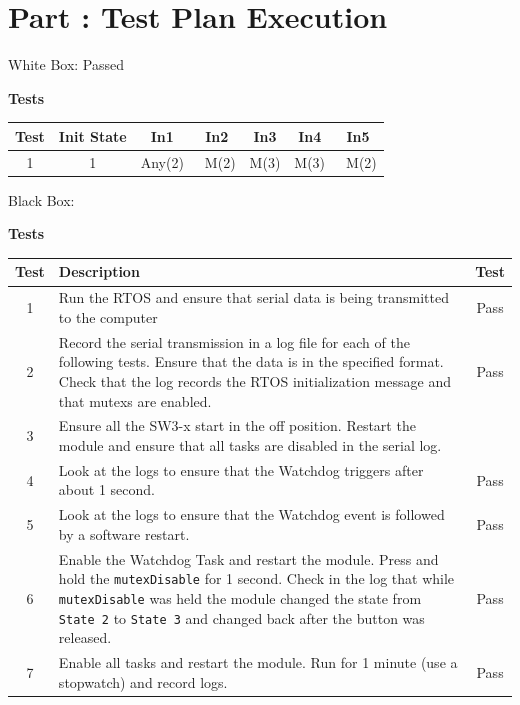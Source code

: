 \documentclass{article}
\newcounter{partNum}
\newcommand{\partNum}{%
        \stepcounter{partNum}%
        \thepartNum}
\newcommand{\sectPart}[1]{\section*{Part \partNum: #1}}
\begin{document}
\sectPart{Test Plan Execution}

White Box: Passed

\begin{center}
    \textbf{Tests}\\
    \vspace{0.5em}
    \begin{tabular}{| c | c | c | c | c | c | c |}
        \hline
        Test & Init State & In1 & In2 & In3 & In4 & In5 \\ \hline
        1 & 1 & Any(2) & ~M(2) & M(3) & M(3) & ~M(2) \\ \hline
    \end{tabular}
\end{center}

Black Box: 

\begin{center}
    \textbf{Tests} \\
    \vspace{0.5em}
    \begin{tabular}{| c | p{35em} | c | }
    \hline
    \textbf{Test} & \textbf{Description} & \textbf{Test} \\ \hline
    1 & Run the RTOS and ensure that serial data is being transmitted to the computer & Pass \\ \hline
    2 & Record the serial transmission in a log file for each of the following tests. Ensure that the data is in the specified format. Check that the log records the RTOS initialization message and that mutexs are enabled. & Pass \\ \hline
    3 & Ensure all the SW3-x start in the off position. Restart the module and ensure that all tasks are disabled in the serial log. \\ \hline
    4 & Look at the logs to ensure that the Watchdog triggers after about 1 second. & Pass \\ \hline
    5 & Look at the logs to ensure that the Watchdog event is followed by a software restart. & Pass \\ \hline
    6 & Enable the Watchdog Task and restart the module. Press and hold the \texttt{mutexDisable} for 1 second. Check in the log that while \texttt{mutexDisable} was held the module changed the state from \texttt{State 2} to \texttt{State 3} and changed back after the button was released. & Pass \\ \hline
    7 & Enable all tasks and restart the module. Run for 1 minute (use a stopwatch) and record logs. & Pass \\ \hline

\end{tabular}
\end{center}
\end{document}

